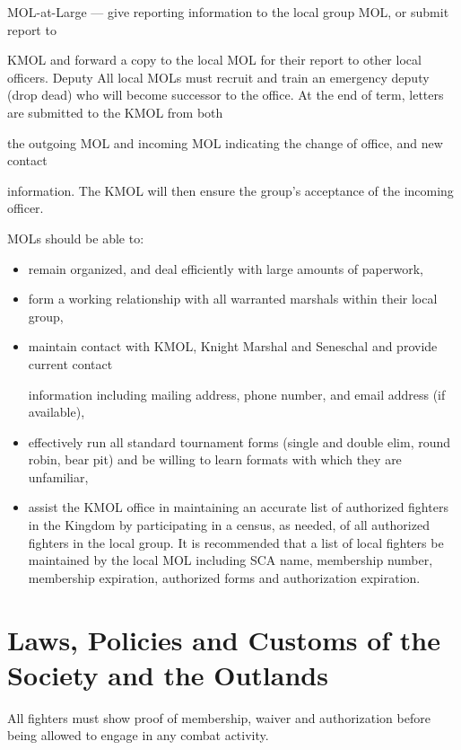\documentclass{article}
\begin{document}
MOL-at-Large --- give reporting information to the local group MOL, or submit report to


KMOL and forward a copy to the local MOL for their report to other local officers.
Deputy All local MOLs must recruit and train an emergency deputy (drop dead) who will become
successor to the office. At the end of term, letters are submitted to the KMOL from both

the outgoing MOL and incoming MOL indicating the change of office, and new contact

information. The KMOL will then ensure the group’s acceptance of the incoming officer.


MOLs should be able to:
\begin{itemize}
\item remain organized, and deal efficiently with large amounts of paperwork,


\item form a working relationship with all warranted marshals within their local group,
\item maintain contact with KMOL, Knight Marshal and Seneschal and provide current contact

information including mailing address, phone number, and email address (if available),


\item effectively run all standard tournament forms (single and double elim, round robin, bear pit) and
be willing to learn formats with which they are unfamiliar,

\item assist the KMOL office in maintaining an accurate list of authorized fighters in the Kingdom by
participating in a census, as needed, of all authorized fighters in the local group. It is
recommended that a list of local fighters be maintained by the local MOL including SCA name,
membership number, membership expiration, authorized forms and authorization expiration.
\end{itemize}


\section{Laws, Policies and Customs of the Society and the Outlands}
All fighters must show proof of membership, waiver and authorization
before being allowed to engage in any combat activity.
\end{document}
